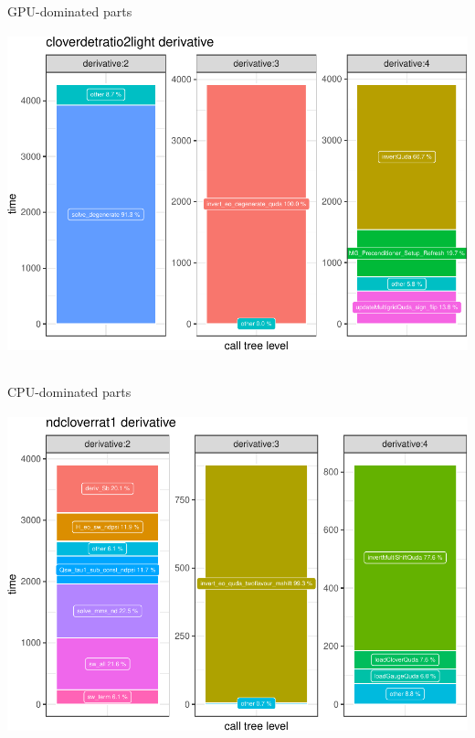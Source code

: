 \documentclass[xcolor={dvipsnames,table}]{beamer}
\begin{document}
\begin{frame}{GPU-dominated parts}
  \centering
  \includegraphics[height=100mm]{gpu_dominated_monomial}
\end{frame}
  
\begin{frame}{CPU-dominated parts}
  \centering
  \includegraphics[height=100mm]{cpu_dominated_monomial}
\end{frame}
\end{document}
